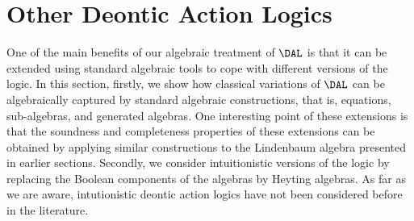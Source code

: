 \section{Other Deontic Action Logics}\label{section:new:dals}
One of the main benefits of our algebraic treatment of $\DAL$ is that it can be extended using standard algebraic tools to cope with different versions of the logic.  In this section, firstly, we show how classical variations of 
$\DAL$ can be algebraically captured by standard algebraic constructions,  that is, equations, sub-algebras, and generated algebras.  One interesting point of these extensions is that the soundness and completeness properties of these extensions can be obtained by applying similar constructions to the Lindenbaum algebra presented in earlier sections.  Secondly, we consider intuitionistic versions of the logic by replacing the Boolean components of the algebras by Heyting algebras.  As far as we are aware, intutionistic deontic action logics have not been considered before in the literature. 






